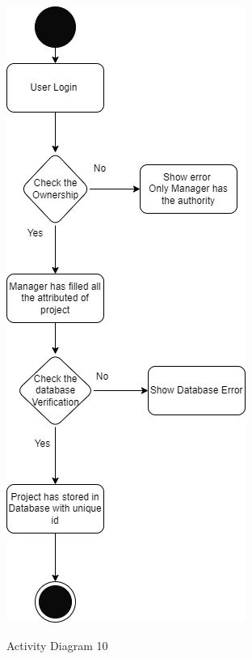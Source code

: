 \begin{figure}[H]
    \centering
    \caption{Activity Diagram 10}
    \includegraphics[scale=0.5]{./diagrams/Activity Diagram/ad-10.png}
    \label{fig:act-10}

\end{figure}



